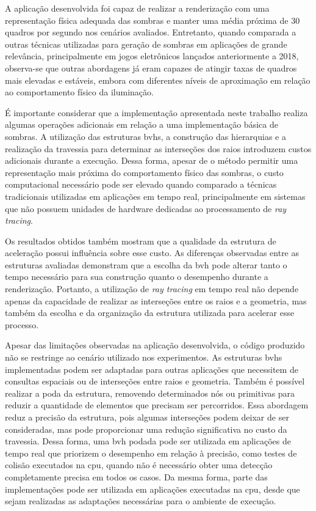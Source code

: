 A aplicação desenvolvida foi capaz de realizar a renderização com uma representação física adequada das sombras e manter uma média próxima de 30 quadros por segundo nos cenários avaliados. Entretanto, quando comparada a outras técnicas utilizadas para geração de sombras em aplicações de grande relevância, principalmente em jogos eletrônicos lançados anteriormente a 2018, observa-se que outras abordagens já eram capazes de atingir taxas de quadros mais elevadas e estáveis, embora com diferentes níveis de aproximação em relação ao comportamento físico da iluminação.

É importante considerar que a implementação apresentada neste trabalho realiza algumas operações adicionais em relação a uma implementação básica de sombras. A utilização das estruturas \glspl{bvh}, a construção das hierarquias e a realização da travessia para determinar as interseções dos raios introduzem custos adicionais durante a execução. Dessa forma, apesar de o método permitir uma representação mais próxima do comportamento físico das sombras, o custo computacional necessário pode ser elevado quando comparado a técnicas tradicionais utilizadas em aplicações em tempo real, principalmente em sistemas que não possuem unidades de hardware dedicadas ao processamento de \textit{ray tracing}.

Os resultados obtidos também mostram que a qualidade da estrutura de aceleração possui influência sobre esse custo. As diferenças observadas entre as estruturas avaliadas demonstram que a escolha da \gls{bvh} pode alterar tanto o tempo necessário para sua construção quanto o desempenho durante a renderização. Portanto, a utilização de \textit{ray tracing} em tempo real não depende apenas da capacidade de realizar as interseções entre os raios e a geometria, mas também da escolha e da organização da estrutura utilizada para acelerar esse processo.

Apesar das limitações observadas na aplicação desenvolvida, o código produzido não se restringe ao cenário utilizado nos experimentos. As estruturas \glspl{bvh} implementadas podem ser adaptadas para outras aplicações que necessitem de consultas espaciais ou de interseções entre raios e geometria. Também é possível realizar a poda da estrutura, removendo determinados nós ou primitivas para reduzir a quantidade de elementos que precisam ser percorridos. Essa abordagem reduz a precisão da estrutura, pois algumas interseções podem deixar de ser consideradas, mas pode proporcionar uma redução significativa no custo da travessia. Dessa forma, uma \gls{bvh} podada pode ser utilizada em aplicações de tempo real que priorizem o desempenho em relação à precisão, como testes de colisão executados na \gls{cpu}, quando não é necessário obter uma detecção completamente precisa em todos os casos. Da mesma forma, parte das implementações pode ser utilizada em aplicações executadas na \gls{cpu}, desde que sejam realizadas as adaptações necessárias para o ambiente de execução.

